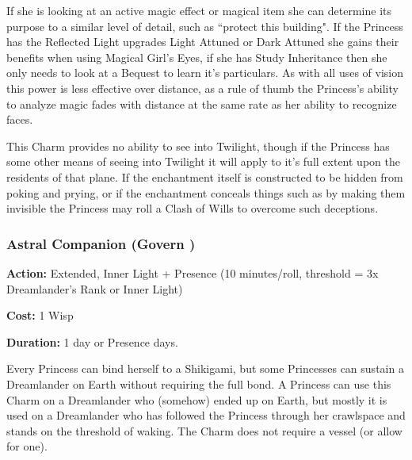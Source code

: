 If she is looking at an active magic effect or magical item she can determine its purpose to a similar level of detail, such as \textquotedblleft protect this building". If the Princess has the Reflected Light upgrades Light Attuned or Dark Attuned she gains their benefits when using Magical Girl's Eyes, if she has Study Inheritance then she only needs to look at a Bequest to learn it's particulars. As with all uses of vision this power is less effective over distance, as a rule of thumb the Princess's ability to analyze magic fades with distance at the same rate as her ability to recognize faces.

This Charm provides no ability to see into Twilight, though if the Princess has some other means of seeing into Twilight it will apply to it's full extent upon the residents of that plane. If the enchantment itself is constructed to be hidden from poking and prying, or if the enchantment conceals things such as by making them invisible the Princess may roll a Clash of Wills to overcome such deceptions. 

\subsubsection*{Astral Companion (Govern \textbullet\textbullet\textbullet)}

\noindent \textbf{Action:} Extended, Inner Light + Presence (10 minutes/roll, threshold = 3x Dreamlander's Rank or Inner Light)

\noindent \textbf{Cost:} 1 Wisp

\noindent \textbf{Duration:} 1 day or Presence days.

Every Princess can bind herself to a Shikigami, but some Princesses can sustain a Dreamlander on Earth without requiring the full bond. A Princess can use this Charm on a Dreamlander who (somehow) ended up on Earth, but mostly it is used on a Dreamlander who has followed the Princess through her crawlspace and stands on the threshold of waking. The Charm does not require a vessel (or allow for one).

